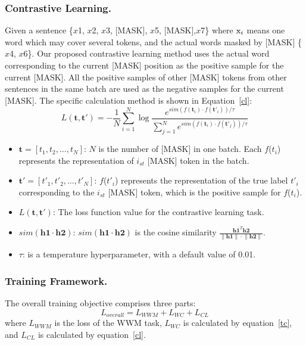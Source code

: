 \subsubsection{Contrastive Learning.}
Given a sentence \{$x${\tiny 1}, $x${\tiny 2}, $x${\tiny 3}, [MASK], $x${\tiny 5}, [MASK],$x${\tiny 7}\} where \($x$_i\) means one word which may cover several tokens, and the actual words masked by [MASK] \{$x${\tiny 4}, $x${\tiny 6}\}. Our proposed contrastive learning method uses the actual word corresponding to the current [MASK] position as the positive sample for the current [MASK]. All the positive samples of other [MASK] tokens from other sentences in the same batch are used as the negative samples for the current [MASK]. The specific calculation method is shown in Equation~\ref{cl}:
\begin{equation}
	\label{cl}
	L(\mathbf{t}, \mathbf{t'}) = -\frac{1}{N} \sum_{i=1}^{N} \log \frac{e^{sim(f(\mathbf{t}_i) \cdot f(\mathbf{t'}_i))/\tau}}{\sum_{j=1}^{N} e^{sim(f(\mathbf{t}_i) \cdot f(\mathbf{t'}_j))/\tau}}
\end{equation}
\begin{itemize}
	\item $\mathbf{t} = [t_1, t_2, \ldots, t_N]$: $N$ is the number of [MASK] in one batch. Each $f$($t_i$) represents the representation of $i_{st}$ [MASK] token in the batch.
	\item $\mathbf{t'} = [t'_1, t'_2, \ldots, t'_N]$: $f$($t'_i$) represents the representation of the true label $t'_i$ corresponding to the $i_{st}$ [MASK] token, which is the positive sample for $f$($t_i$).
	\item $L(\mathbf{t}, \mathbf{t'})$: The loss function value for the contrastive learning task.
	\item \(sim(\mathbf{h1} \cdot \mathbf{h2})\): \(sim(\mathbf{h1} \cdot \mathbf{h2})\) is the cosine similarity \(\tfrac{\mathbf{h1}^T\mathbf{h2}}{\lVert \mathbf{h1} \rVert \cdot \lVert \mathbf{h2} \rVert}\).
	\item \(\tau\): is a temperature hyperparameter, with a default value of 0.01.
\end{itemize}
\subsubsection{Training Framework.}
The overall training objective comprises three parts:
\begin{equation}
	\label{allloss}
	L_{overall} = L_{WWM} + L_{WC} + L_{CL} 
\end{equation}
where \(L_{WWM}\) is the loss of the WWM task, \(L_{WC}\) is calculated by equation~\ref{tc}, and \(L_{CL}\) is calculated by equation~\ref{cl}.

